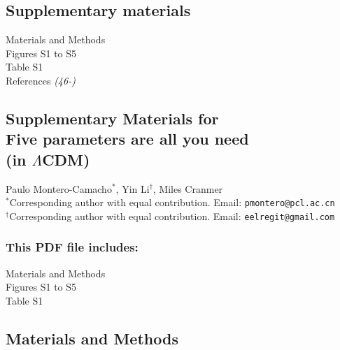 \documentclass[12pt]{article}
\def\scititle{Five parameters are all you need\\(in $\Lambda$CDM)}
\begin{document}

\subsection*{Supplementary materials}
Materials and Methods\\
Figures S1 to S5\\
Table S1 \\
References \textit{(46-)}  %





\newpage


\renewcommand{\thefigure}{S\arabic{figure}}
\renewcommand{\thetable}{S\arabic{table}}
\renewcommand{\theequation}{S\arabic{equation}}
\renewcommand{\thepage}{S\arabic{page}}
\setcounter{figure}{0}
\setcounter{table}{0}
\setcounter{equation}{0}
\setcounter{page}{1}  %




\begin{center}
\section*{Supplementary Materials for\\ \scititle}
Paulo Montero-Camacho$^\ast$,
Yin Li$^\dagger$,
Miles Cranmer\\
\small$^\ast$Corresponding author with equal contribution. Email:
\texttt{pmontero@pcl.ac.cn}\\
\small$^\dagger$Corresponding author with equal contribution. Email:
\texttt{eelregit@gmail.com}
\end{center}



\subsubsection*{This PDF file includes:}
Materials and Methods\\
Figures S1 to S5\\
Table S1



\newpage




\subsection*{Materials and Methods}
\label{sec:methods}
\end{document}
